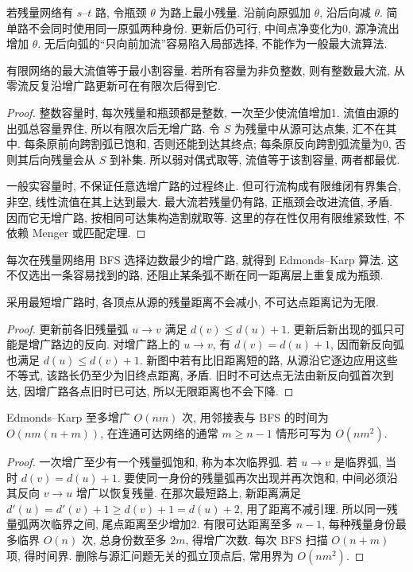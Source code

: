 若残量网络有 $s$--$t$ 路, 令瓶颈 $\theta$ 为路上最小残量. 沿前向原弧加 $\theta$, 沿后向减 $\theta$. 简单路不会同时使用同一原弧两种身份. 更新后仍可行, 中间点净变化为0, 源净流出增加 $\theta$. 无后向弧的“只向前加流”容易陷入局部选择, 不能作为一般最大流算法.
\begin{theorem}[最大流最小割]\label{thm:maxflow}
有限网络的最大流值等于最小割容量. 若所有容量为非负整数, 则有整数最大流, 从零流反复沿增广路更新可在有限次后得到它.
\end{theorem}
\begin{proof}
整数容量时, 每次残量和瓶颈都是整数, 一次至少使流值增加1. 流值由源的出弧总容量界住, 所以有限次后无增广路. 令 $S$ 为残量中从源可达点集, 汇不在其中. 每条原前向跨割弧已饱和, 否则还能到达其终点; 每条原反向跨割弧流量为0, 否则其后向残量会从 $S$ 到补集. 所以弱对偶式取等, 流值等于该割容量, 两者都最优.

一般实容量时, 不保证任意选增广路的过程终止. 但可行流构成有限维闭有界集合, 非空, 线性流值在其上达到最大. 最大流若残量仍有路, 正瓶颈会改进流值, 矛盾. 因而它无增广路, 按相同可达集构造割就取等. 这里的存在性仅用有限维紧致性, 不依赖 Menger 或匹配定理.
\end{proof}
每次在残量网络用 BFS 选择边数最少的增广路, 就得到 Edmonds--Karp 算法. 这不仅选出一条容易找到的路, 还阻止某条弧不断在同一距离层上重复成为瓶颈.
\begin{lemma}\label{lem:residualdistance}
采用最短增广路时, 各顶点从源的残量距离不会减小, 不可达点距离记为无限.
\end{lemma}
\begin{proof}
更新前各旧残量弧 $u\to v$ 满足 $d(v)\le d(u)+1$. 更新后新出现的弧只可能是增广路边的反向. 对增广路上的 $u\to v$, 有 $d(v)=d(u)+1$, 因而新反向弧也满足 $d(u)\le d(v)+1$. 新图中若有比旧距离短的路, 从源沿它逐边应用这些不等式, 该路长仍至少为旧终点距离, 矛盾. 旧时不可达点无法由新反向弧首次到达, 因增广路各点旧时已可达, 所以无限距离也不会下降.
\end{proof}
\begin{theorem}
Edmonds--Karp 至多增广 $O(nm)$ 次, 用邻接表与 BFS 的时间为 $O(nm(n+m))$, 在连通可达网络的通常 $m\ge n-1$ 情形可写为 $O(nm^2)$.
\end{theorem}
\begin{proof}
一次增广至少有一个残量弧饱和, 称为本次临界弧. 若 $u\to v$ 是临界弧, 当时 $d(v)=d(u)+1$. 要使同一身份的残量弧再次出现并再次饱和, 中间必须沿其反向 $v\to u$ 增广以恢复残量. 在那次最短路上, 新距离满足 $d'(u)=d'(v)+1\ge d(v)+1=d(u)+2$, 用了距离不减引理. 所以同一残量弧两次临界之间, 尾点距离至少增加2. 有限可达距离至多 $n-1$, 每种残量身份最多临界 $O(n)$ 次, 总身份数至多 $2m$, 得增广次数. 每次 BFS 扫描 $O(n+m)$ 项, 得时间界. 删除与源汇问题无关的孤立顶点后, 常用界为 $O(nm^2)$.
\end{proof}
